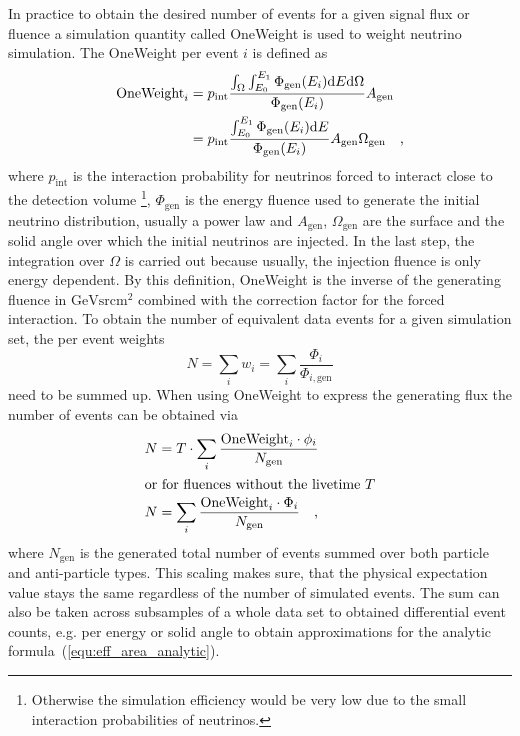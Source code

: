 In practice to obtain the desired number of events for a given signal flux or fluence a simulation quantity called OneWeight is used to weight neutrino simulation.
The OneWeight per event $i$ is defined as 
\begin{align}
  \label{equ:oneweight_definition}
  \text{OneWeight}_i
  &= p_\text{int}\frac{\int_\Omega\int_{E_0}^{E_1}
                       \Phi_\text{gen}(E_i)\mathrm{d}E\mathrm{d}\Omega
                       }{\Phi_\text{gen}(E_i)}A_\text{gen} \\
  &= p_\text{int}\frac{\int_{E_0}^{E_1}\Phi_\text{gen}(E_i)\mathrm{d}E}
                      {\Phi_\text{gen}(E_i)}
    A_\text{gen}\Omega_\text{gen}
  \quad\text{,}
\end{align}
where $p_\text{int}$ is the interaction probability for neutrinos forced to interact close to the detection volume \footnote{Otherwise the simulation efficiency would be very low due to the small interaction probabilities of neutrinos.}, $\Phi_\text{gen}$ is the energy fluence used to generate the initial neutrino distribution, usually a power law and $A_\text{gen}$, $\Omega_\text{gen}$ are the surface and the solid angle over which the initial neutrinos are injected.
In the last step, the integration over $\Omega$ is carried out because usually, the injection fluence is only energy dependent.
By this definition, OneWeight is the inverse of the generating fluence in $\si{\GeV\steradian\cm\squared}$ combined with the correction factor for the forced interaction.
To obtain the number of equivalent data events for a given simulation set, the per event weights
\begin{equation}
  N = \sum_i w_i = \sum_i \frac{\Phi_i}{\Phi_{i,\text{gen}}}
\end{equation}
need to be summed up.
When using OneWeight to express the generating flux the number of events can be obtained via
\begin{align}
  N &= T \cdot \sum_i \frac{\text{OneWeight}_i \cdot \phi_i}{N_\text{gen}} \\
  \intertext{or for fluences without the livetime $T$}
  N &= \sum_i \frac{\text{OneWeight}_i \cdot \Phi_i}{N_\text{gen}}
  \quad\text{,}
\end{align}
where $N_\text{gen}$ is the generated total number of events summed over both particle and anti-particle types.
This scaling makes sure, that the physical expectation value stays the same regardless of the number of simulated events.
The sum can also be taken across subsamples of a whole data set to obtained differential event counts, e.g. per energy or solid angle to obtain approximations for the analytic formula~(\ref{equ:eff_area_analytic}).

